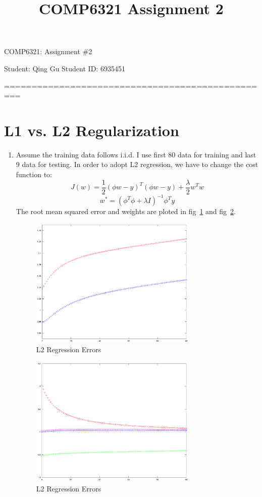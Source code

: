 \documentclass[a4paper, 12pt, titlepage]{article}
\begin{document}
\title{COMP6321 Assignment 2}
\setcounter{tocdepth}{2}
\newpage
\begin{center}
    {\huge COMP6321: Assignment \#2}


    \vspace{2cm}
    Student: Qing Gu  \hspace{5cm}
    Student ID: 6935451
    \vspace{1cm}

    =================================================
\end{center}
\section{L1 vs. L2 Regularization}
\begin{enumerate}
    \item Assume the training data follows i.i.d. I use first 80 data for training and last 9 data for testing. In order to adopt L2 regression, we have to change the cost function to:
        $$J(w) = \frac{1}{2}(\phi{}w-y)^T(\phi{}w-y)+\frac{\lambda}{2}w^Tw$$
        $$w^* = (\phi^T\phi+\lambda{}I)^{-1}\phi^Ty$$
        The root mean squared error and weights are ploted in fig~\ref{l2err} and fig~\ref{l2weight}.

            \begin{figure}[H]
                \centering
                \includegraphics[width=8cm]{L2Err.eps}
                \caption{L2 Regression Errors}\label{l2err}
            \end{figure}

            \begin{figure}[H]
                \centering
                \includegraphics[width=8cm]{L2Weight.eps}
                \caption{L2 Regression Errors}\label{l2weight}
            \end{figure}


\end{enumerate}
\end{document}
